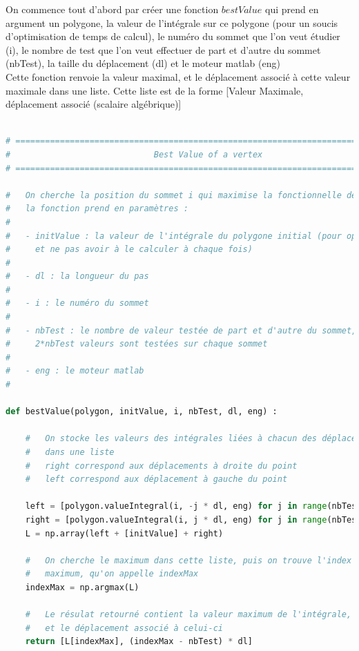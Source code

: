 \documentclass[a4paper,reqno]{article}
\begin{document}
On commence tout d'abord par créer une fonction $bestValue$ qui prend en argument un polygone, la valeur de l'intégrale sur ce polygone (pour un soucis d'optimisation de temps de calcul), le numéro du sommet que l'on veut étudier (i), le nombre de test que l'on veut effectuer de part et d'autre du sommet (nbTest), la taille du déplacement (dl) et le moteur matlab (eng)\\
Cette fonction renvoie la valeur maximal, et le déplacement associé à cette valeur maximale dans une liste. Cette liste est de la forme [Valeur Maximale, déplacement associé (scalaire algébrique)]
\newpage
\begin{lstlisting}[language=Python,frame=single,caption=Fonction permettant de trouver la meilleure valeur de la temperature pour le déplacement d'un seul sommet]

# =============================================================================
#                             Best Value of a vertex
# =============================================================================

#   On cherche la position du sommet i qui maximise la fonctionnelle de forme
#   la fonction prend en paramètres :
#
#   - initValue : la valeur de l'intégrale du polygone initial (pour optimiser
#     et ne pas avoir à le calculer à chaque fois)
#
#   - dl : la longueur du pas
#
#   - i : le numéro du sommet
#
#   - nbTest : le nombre de valeur testée de part et d'autre du sommet, en tout
#     2*nbTest valeurs sont testées sur chaque sommet
#
#   - eng : le moteur matlab
#

def bestValue(polygon, initValue, i, nbTest, dl, eng) :

    #   On stocke les valeurs des intégrales liées à chacun des déplacements
    #   dans une liste
    #   right correspond aux déplacements à droite du point
    #   left correspond aux déplacement à gauche du point

    left = [polygon.valueIntegral(i, -j * dl, eng) for j in range(nbTest)]
    right = [polygon.valueIntegral(i, j * dl, eng) for j in range(nbTest)]
    L = np.array(left + [initValue] + right)

    #   On cherche le maximum dans cette liste, puis on trouve l'index de ce
    #   maximum, qu'on appelle indexMax
    indexMax = np.argmax(L)

    #   Le résulat retourné contient la valeur maximum de l'intégrale,
    #   et le déplacement associé à celui-ci
    return [L[indexMax], (indexMax - nbTest) * dl]


\end{lstlisting}
\end{document}

